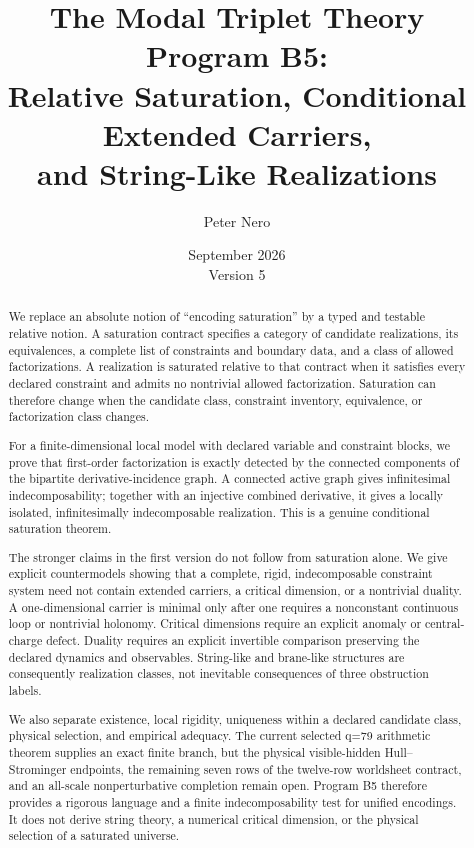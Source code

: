 \documentclass[11pt]{article}
\title{The Modal Triplet Theory Program B5:\\
Relative Saturation, Conditional Extended Carriers,\\
and String-Like Realizations}
\author{Peter Nero}
\date{September 2026\\Version 5}
\begin{document}
\maketitle

\begin{abstract}
We replace an absolute notion of ``encoding saturation'' by a typed and
testable relative notion.  A saturation contract specifies a category of
candidate realizations, its equivalences, a complete list of constraints and
boundary data, and a class of allowed factorizations.  A realization is
saturated relative to that contract when it satisfies every declared
constraint and admits no nontrivial allowed factorization.  Saturation can
therefore change when the candidate class, constraint inventory, equivalence,
or factorization class changes.

For a finite-dimensional local model with declared variable and constraint
blocks, we prove that first-order factorization is exactly detected by the
connected components of the bipartite derivative-incidence graph.  A connected
active graph gives infinitesimal indecomposability; together with an injective
combined derivative, it gives a locally isolated, infinitesimally
indecomposable realization.  This is a genuine conditional saturation theorem.

The stronger claims in the first version do not follow from saturation alone.
We give explicit countermodels showing that a complete, rigid, indecomposable
constraint system need not contain extended carriers, a critical dimension, or
a nontrivial duality.  A one-dimensional carrier is minimal only after one
requires a nonconstant continuous loop or nontrivial holonomy.  Critical
dimensions require an explicit anomaly or central-charge defect.  Duality
requires an explicit invertible comparison preserving the declared dynamics
and observables.  String-like and brane-like structures are consequently
realization classes, not inevitable consequences of three obstruction labels.

We also separate existence, local rigidity, uniqueness within a declared
candidate class, physical selection, and empirical adequacy.  The current
selected q=79 arithmetic theorem supplies an exact finite branch, but the
physical visible-hidden Hull--Strominger endpoints, the remaining seven rows of
the twelve-row worldsheet contract, and an all-scale nonperturbative completion
remain open.  Program B5 therefore provides a rigorous language and a finite
indecomposability test for unified encodings.  It does not derive string theory,
a numerical critical dimension, or the physical selection of a saturated
universe.
\end{abstract}
\end{document}
